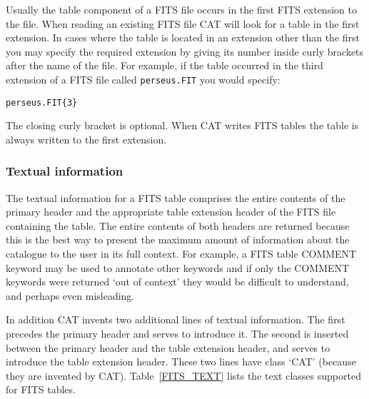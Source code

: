 Usually the table component of a FITS file occurs in the first FITS
extension to the file. When reading an existing FITS file CAT will look
for a table in the first extension. In cases where the table is located
in an extension other than the first you may specify the required
extension by giving its number inside curly brackets after the name
of the file. For example, if the table occurred in the third extension
of a FITS file called {\tt perseus.FIT} you would specify:

\begin{verbatim}
perseus.FIT{3}
\end{verbatim}

The closing curly bracket is optional. When CAT writes FITS tables
the table is always written to the first extension.

\subsubsection{Textual information}

The textual information for a FITS table comprises the entire contents
of the primary header and the appropriate table extension header of the
FITS file containing the table. The entire contents of both headers are
returned because this is the best way to present the maximum amount of
information about the catalogue to the user in its full context. For
example, a FITS table COMMENT keyword may be used to annotate other
keywords and if only the COMMENT keywords were returned `out of context'
they would be difficult to understand, and perhaps even misleading.

In addition CAT invents two additional lines of textual information.
The first precedes the primary header and serves to introduce it. The
second is inserted between the primary header and the table extension
header, and serves to introduce the table extension header. These two
lines have class `CAT' (because they are invented by CAT).
Table~\ref{FITS_TEXT} lists the text classes supported for FITS
tables.


